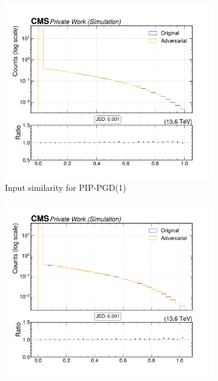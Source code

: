 \begin{figure}[htbp]
  \centering
  \begin{subfigure}[t]{0.32\textwidth}
    \includegraphics[width=\linewidth]{media/output/features/compare/combined_it_1/cmp_vtx_arr_sv_enratio.pdf}
    \caption*{Input similarity for PIP-PGD(1)}
  \end{subfigure}\hfill
  \begin{subfigure}[t]{0.32\textwidth}
    \includegraphics[width=\linewidth]{media/output/features/compare/combined_it_2/cmp_vtx_arr_sv_enratio.pdf}

\end{subfigure}
\end{figure}
